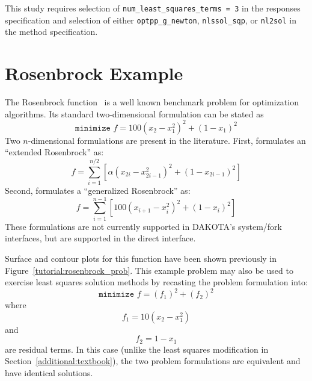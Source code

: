 This study requires selection of \texttt{num\_least\_squares\_terms = 3} 
in the responses specification and selection of either 
\texttt{optpp\_g\_newton}, \texttt{nlssol\_sqp}, or \texttt{nl2sol} in 
the method specification.

\section{Rosenbrock Example}\label{additional:rosenbrock}

The Rosenbrock function~\cite{Gil81} is a well known benchmark problem
for optimization algorithms. Its standard two-dimensional formulation
can be stated as
\begin{equation}
\texttt{minimize } f=100(x_2-x_1^2)^2+(1-x_1)^2 \label{additional:rosenstd}
\end{equation}
Two $n$-dimensional formulations are present in the literature.
First, \cite{Noc99} formulates an ``extended Rosenbrock'' as:
\begin{equation}
f = \sum_{i=1}^{n/2} \left[ \alpha (x_{2i}-x_{2i-1}^2)^2+(1-x_{2i-1})^2 \right]
\label{additional:rosenexd}
\end{equation}
Second, \cite{Sch87} formulates a ``generalized Rosenbrock'' as:
\begin{equation}
f = \sum_{i=1}^{n-1} \left[ 100 (x_{i+1}-x_i^2)^2+(1-x_i)^2 \right]
\label{additional:rosengen}
\end{equation}
These formulations are not currently supported in DAKOTA's
system/fork interfaces, but are supported in the direct interface.


Surface and contour plots for this function have been shown previously
in Figure~\ref{tutorial:rosenbrock_prob}. This example problem
may also be used to exercise least squares solution methods by
recasting the problem formulation into:
\begin{equation}
\texttt{minimize } f = (f_1)^2+(f_2)^2 \label{additional:rosenls}
\end{equation}
where
\begin{equation}
f_1 = 10 (x_2 - x_1^2) \label{additional:rosenr1}
\end{equation}
and
\begin{equation}
f_2 = 1 - x_1 \label{additional:rosenr2}
\end{equation}
are residual terms. In this case (unlike the least squares
modification in Section~\ref{additional:textbook}), the two problem
formulations are equivalent and have identical solutions.

